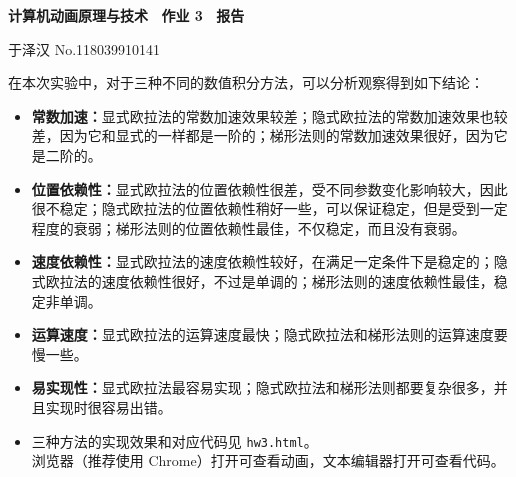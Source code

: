 \documentclass[a4paper, 12pt]{article}
\begin{document}
\begin{center}
{\bfseries {计算机动画原理与技术 ~作业 3 ~报告}}

\vspace{0.5\baselineskip}

{ \kaishu 于泽汉 \hspace{1em} \textsf{No.118039910141}}
\end{center}

在本次实验中，对于三种不同的数值积分方法，可以分析观察得到如下结论：

\begin{itemize}[leftmargin=2em, label={}]
\item \textbf{常数加速：}显式欧拉法的常数加速效果较差；隐式欧拉法的常数加速效果也较差，因为它和显式的一样都是一阶的；梯形法则的常数加速效果很好，因为它是二阶的。

\item \textbf{位置依赖性：}显式欧拉法的位置依赖性很差，受不同参数变化影响较大，因此很不稳定；隐式欧拉法的位置依赖性稍好一些，可以保证稳定，但是受到一定程度的衰弱；梯形法则的位置依赖性最佳，不仅稳定，而且没有衰弱。

\item \textbf{速度依赖性：}显式欧拉法的速度依赖性较好，在满足一定条件下是稳定的；隐式欧拉法的速度依赖性很好，不过是单调的；梯形法则的速度依赖性最佳，稳定非单调。

\item \textbf{运算速度：}显式欧拉法的运算速度最快；隐式欧拉法和梯形法则的运算速度要慢一些。

\item \textbf{易实现性：}显式欧拉法最容易实现；隐式欧拉法和梯形法则都要复杂很多，并且实现时很容易出错。

\end{itemize}


\begin{itemize}[leftmargin=2em, label={}]

\item 三种方法的实现效果和对应代码见 \texttt{hw3.html}。\\
浏览器（推荐使用 Chrome）打开可查看动画，文本编辑器打开可查看代码。\\





\end{itemize}
\end{document}
